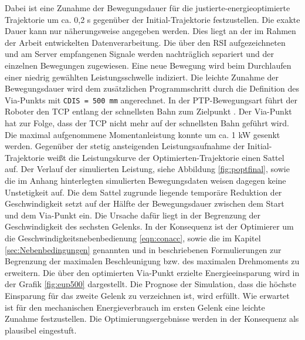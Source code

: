 Dabei ist eine Zunahme der Bewegungsdauer für die justierte-energieoptimierte Trajektorie um ca. 0,2 s gegenüber der Initial-Trajektorie festzustellen. Die exakte Dauer kann nur näherungsweise angegeben werden. Dies liegt an der im Rahmen der Arbeit entwickelten Datenverarbeitung. Die über den RSI aufgezeichneten und am Server empfangenen Signale werden nachträglich separiert und der einzelnen Bewegungen zugewiesen. Eine neue Bewegung wird beim Durchlaufen einer niedrig gewählten Leistungsschwelle indiziert. Die leichte Zunahme der Bewegungsdauer wird  dem zusätzlichen Programmschritt durch die Definition des Via-Punkts mit \lstinline|CDIS = 500 mm| angerechnet. In der PTP-Bewegungsart führt der Roboter den TCP entlang der schnellsten Bahn zum Zielpunkt \cite[S.~429]{KSS.2023}. Der Via-Punkt hat zur Folge, dass der TCP nicht mehr auf der schnellsten Bahn geführt wird. Die maximal aufgenommene Momentanleistung konnte um ca. 1 kW gesenkt werden. 
Gegenüber der stetig ansteigenden Leistungsaufnahme der Initial-Trajektorie weißt die Leistungskurve der Optimierten-Trajektorie einen Sattel auf.  Der Verlauf der simulierten Leistung, siehe Abbildung \ref{fig:poptfinal}, sowie die im Anhang hinterlegten simulierten Bewegungsdaten weisen dagegen keine Unstetigkeit auf. Die dem Sattel zugrunde liegende temporäre Reduktion der Geschwindigkeit setzt auf der Hälfte der Bewegungsdauer zwischen dem Start und dem Via-Punkt ein. Die Ursache dafür liegt in der Begrenzung der Geschwindigkeit des sechsten Gelenks. In der Konsequenz ist der Optimierer um die Geschwindigkeitsnebenbedienung \ref{eqn:conacc}, sowie die im Kapitel \ref{sec:Nebenbedingungen} genannten und in \cite[S.~5]{Hansen.2012} beschriebenen Formulierungen zur Begrenzung der maximalen Beschleunigung bzw. des maximalen Drehmoments zu erweitern. 
Die über den optimierten Via-Punkt erzielte Energieeinsparung wird in der Grafik \ref{fig:eup500} dargestellt. Die Prognose der Simulation, dass die höchste Einsparung für das zweite Gelenk zu verzeichnen ist, wird erfüllt. Wie erwartet ist für den mechanischen Energieverbrauch im ersten Gelenk eine leichte Zunahme festzustellen. Die Optimierungsergebnisse werden in der Konsequenz als plausibel eingestuft. 

